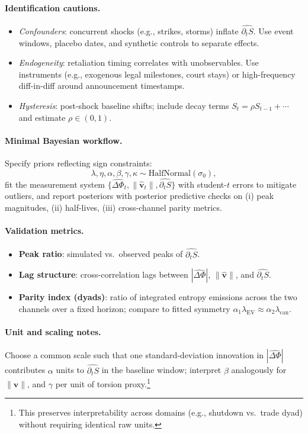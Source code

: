 \documentclass{article}
\begin{document}
\paragraph{Identification cautions.}
\begin{itemize}
\item \emph{Confounders}: concurrent shocks (e.g., strikes, storms) inflate $\widehat{\partial_t S}$.
Use event windows, placebo dates, and synthetic controls to separate effects.
\item \emph{Endogeneity}: retaliation timing correlates with unobservables. Use instruments
(e.g., exogenous legal milestones, court stays) or high-frequency diff-in-diff around
announcement timestamps.
\item \emph{Hysteresis}: post-shock baseline shifts; include decay terms
$S_{t} = \rho S_{t-1} + \cdots$ and estimate $\rho\in(0,1)$.
\end{itemize}

\paragraph{Minimal Bayesian workflow.}
Specify priors reflecting sign constraints:
\[
\lambda,\eta,\alpha,\beta,\gamma,\kappa \sim \mathrm{HalfNormal}(\sigma_0),
\]
fit the measurement system
$\{\widehat{\Delta \Phi}_t,\|\widehat{\mathbf{v}}_t\|,\widehat{\partial_t S}\}$ with
student-\(t\) errors to mitigate outliers, and report posteriors with posterior predictive checks
on (i) peak magnitudes, (ii) half-lives, (iii) cross-channel parity metrics.

\paragraph{Validation metrics.}
\begin{itemize}
\item \textbf{Peak ratio}: simulated vs.\ observed peaks of $\widehat{\partial_t S}$.
\item \textbf{Lag structure}: cross-correlation lags between $|\widehat{\Delta \Phi}|$,
$\|\widehat{\mathbf{v}}\|$, and $\widehat{\partial_t S}$.
\item \textbf{Parity index (dyads)}: ratio of integrated entropy emissions across the two
channels over a fixed horizon; compare to fitted symmetry
$\alpha_1\lambda_{\mathrm{EV}} \approx \alpha_2\lambda_{\mathrm{can}}$.
\end{itemize}

\paragraph{Unit and scaling notes.}
Choose a common scale such that one standard-deviation innovation in
$|\widehat{\Delta \Phi}|$ contributes $\alpha$ units to $\widehat{\partial_t S}$ in the
baseline window; interpret $\beta$ analogously for $\|\widehat{\mathbf{v}}\|$, and $\gamma$
per unit of torsion proxy.\footnote{This preserves interpretability across domains
(e.g., shutdown vs.\ trade dyad) without requiring identical raw units.}
\end{document}
